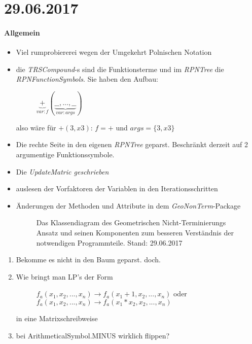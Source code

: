 \section*{29.06.2017}

\paragraph{Allgemein}
\begin{itemize}
	\item Viel rumprobiererei wegen der Umgekehrt Polnischen Notation
	\item die \emph{TRSCompound}-s sind die Funktionsterme und im \emph{RPNTree} die \emph{RPNFunctionSymbols}. Sie haben den Aufbau:
		\begin{figure}[H]
			\centering
			$\underbrace{+}_{var: f} ( \underbrace{\_\_, ..., \_\_}_{var: args} ) $
		\end{figure}
		also wäre für $+(3,x3)$: $f=+$ und $args = \{3, x3\}$
	\item Die rechte Seite in den eigenen \emph{RPNTree} geparst. Beschränkt derzeit auf 2 argumentige Funktionssymbole.
	\item Die \emph{UpdateMatric geschrieben}
	\item auslesen der Vorfaktoren der Variablen in den Iterationsschritten
	\item Änderungen der Methoden und Attribute in dem \emph{GeoNonTerm}-Package
	\begin{figure}[H]
		\centering
		
		\caption{Das Klassendiagram des Geometrischen Nicht-Terminierungs Ansatz und seinen Komponenten zum besseren Verständnis der notwendigen Programmteile. Stand: 29.06.2017}
		\label{29.06.2017:: GeoNonTerm-classdiagram}
	\end{figure}
\end{itemize}

\begin{enumerate}
	\item Bekomme es nicht in den Baum geparst. \answer doch. 
	\item Wie bringt man LP's der Form
		\begin{figure}[H]
			$f_a(x_1, x_2, ..., x_n) \rightarrow f_a (x_1+1, x_2, ..., x_n)$ oder
			$f_a(x_1, x_2, ..., x_n) \rightarrow f_a (x_1*x_2, x_2, ..., x_n)$
		\end{figure}
		in eine Matrixschreibweise
	\item bei ArithmeticalSymbol.MINUS wirklich flippen?
\end{enumerate}